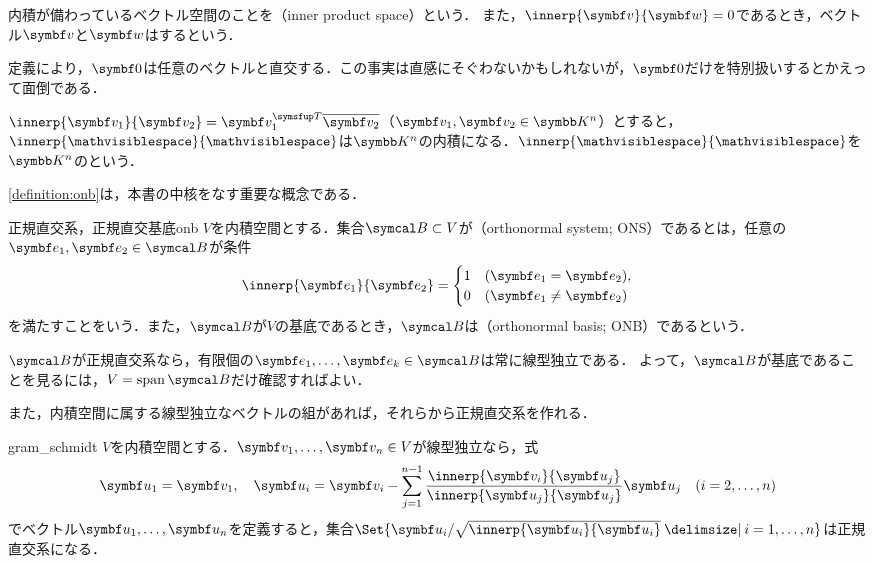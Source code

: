 \documentclass[../../main]{subfiles}
\begin{document}
内積が備わっているベクトル空間のことを（inner product space）という．
また，\(\innerp{\vect{v}}{\vect{w}}=0\)であるとき，ベクトル\(\vect{v}\)と\(\vect{w}\)はするという．

\begin{note}
  定義により，\(\zvec\)は任意のベクトルと直交する．この事実は直感にそぐわないかもしれないが，\(\zvec\)だけを特別扱いするとかえって面倒である．
\end{note}

\begin{example}[標準内積]
  \(\innerp{\vect{v}_1}{\vect{v}_2}=\trps{\vect{v}_1}\conj{\vect{v}_2}\)（\(\vect{v}_1,\vect{v}_2\in\numset{K}^n\)）とすると，
  \(\innerp{\holder}{\holder}\)は\(\numset{K}^n\)の内積になる．\(\innerp{\holder}{\holder}\)を\(\numset{K}^n\)のという．
\end{example}

\cref{definition:onb}は，本書の中核をなす重要な概念である．

\begin{definition}{正規直交系，正規直交基底}{onb}
  \(V\)を内積空間とする．集合\(\basis{B}\subset V\)が（orthonormal system; ONS）であるとは，任意の\(\vect{e}_1,\vect{e}_2\in\basis{B}\)が条件
  \[
    \innerp{\vect{e}_1}{\vect{e}_2} = \begin{cases}1 & (\vect{e}_1=\vect{e}_2),\\ 0 & (\vect{e}_1\neq\vect{e}_2)\end{cases}
  \]
  を満たすことをいう．また，\(\basis{B}\)が\(V\)の基底であるとき，\(\basis{B}\)は（orthonormal basis; ONB）であるという．
\end{definition}

\(\basis{B}\)が正規直交系なら，有限個の\(\vect{e}_1,\dots,\vect{e}_k\in\basis{B}\)は常に線型独立である．
よって，\(\basis{B}\)が基底であることを見るには，\(V=\spannedby\basis{B}\)だけ確認すればよい．

また，内積空間に属する線型独立なベクトルの組があれば，それらから正規直交系を作れる．

\begin{proposition}{}{gram_schmidt}
  \(V\)を内積空間とする．\(\vect{v}_1,\dots,\vect{v}_n\in V\)が線型独立なら，式
  \[
    \vect{u}_1 = \vect{v}_1,
    \quad\vect{u}_i = \vect{v}_i-\sum_{j=1}^{n-1}\frac{\innerp{\vect{v}_i}{\vect{u}_j}}{\innerp{\vect{u}_j}{\vect{u}_j}}\vect{u}_j\quad(i=2,\dots,n)
  \]
  でベクトル\(\vect{u}_1,\dots,\vect{u}_n\)を定義すると，集合\(\Set{\vect{u}_i/\sqrt{\innerp{\vect{u}_i}{\vect{u}_i}}\given i=1,\dots,n}\)は正規直交系になる．
\end{proposition}
\end{document}
